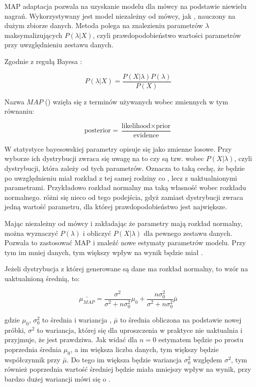 MAP adaptacja pozwala na uzyskanie modelu dla mówcy na podstawie niewielu nagrań. Wykorzystywany jest model niezależny
od mówcy, jak , nauczony na dużym zbiorze danych. Metoda polega na znalezieniu parametrów $\lambda$
maksymalizujących $P(\lambda | X)$, czyli prawdopodobieństwo wartości parametrów przy uwzględnieniu zestawu danych.

Zgodnie z regułą Bayesa :

$$P(\lambda | X) = \frac{P(X | \lambda) P(\lambda)}{P(X)}$$

Nazwa $MAP$ () wzięła się z terminów używanych wobec zmiennych w tym równaniu:

$$\text{posterior} = \frac{\text{likelihood} \times \text{prior}}{\text{evidence}}$$

W statystyce bayesowskiej parametry opisuje się jako zmienne losowe. Przy wyborze ich dystrybucji zwraca się uwagę
na to czy są tzw.  wobec $P(X | \lambda)$, czyli dystrybucji, która zależy od tych parametrów.
Oznacza to taką cechę, że  będzie po uwzględnieniu  miał rozkład z tej samej
rodziny co , lecz z uaktualnionymi parametrami. Przykładowo rozkład normalny ma taką własność wobec
rozkładu normalnego.   różni się nieco od tego podejścia, gdyż zamiast dystrybucji zwraca jedną
wartość parametru, dla której prawdopodobieństwo jest największe.

Mając  niezależny od mówcy i zakładając że parametry mają rozkład normalny, można wyznaczyć
$P(\lambda)$ i obliczyć $P(X | \lambda)$ dla pewnego zestawu danych. Pozwala to zastosować MAP i znaleźć nowe
estymaty parametrów modelu. Przy tym im mniej danych, tym większy wpływ na wynik będzie miał .

Jeżeli dystrybucja z której generowane są dane ma rozkład normalny, to wzór na uaktualnioną średnią, to:

$$\bar{\mu_{MAP}} = \frac{\sigma^2}{\sigma^2 + n \sigma_0^2} \mu_0 + \frac{n \sigma^2_0}{\sigma^2 + n \sigma_0^2} \bar{\mu}$$

gdzie $\mu_0$, $\sigma_0^2$ to średnia i wariancja , $\bar{\mu}$ to średnia obliczona na podstawie nowej próbki, $\sigma^2$ to wariancja, której się dla uproszczenia w praktyce nie uaktualnia i przyjmuje, że jest prawdziwa. Jak widać
dla $n = 0$  estymatem będzie po prostu poprzednia średnia $\mu_0$, a im większa liczba danych, tym
większy będzie współczynnik przy $\bar{\mu}$. Do tego im większa będzie wariancja  $\sigma_0^2$ względem
$\sigma^2$, tym również poprzednia wartość średniej będzie miała mniejszy wpływ na wynik, przy bardzo dużej wariancji
mówi się o \cite{fundamentalsOfSpeech}.


